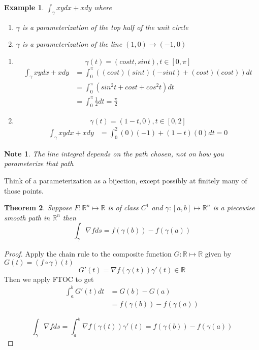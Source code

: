 \documentclass[12pt]{article}
\theoremstyle{plain}
\newtheorem*{note}{Note}
\newtheorem{theorem}{Theorem}[section]
\newtheorem{example}[theorem]{Example}
\theoremstyle{definition}
\begin{document}
\begin{example}
	$\int_\gamma xy dx + xdy$ where
	\begin{enumerate}
		\item{$\gamma$ is a parameterization of the top half of the unit circle}
		\item{$\gamma$ is a parameterization of the line $(1,0) \to (-1,0)$}
	\end{enumerate}

	\begin{enumerate}
	\item{
		$$\gamma (t) = (cost t, sin t), t \in [0,\pi]$$
		\begin{align*}
			\int_\gamma xy dx + xdy &= \int^\pi_0 ((cost)(sint)(-sint) + (cost)(cost))dt\\
			&= \int^\pi_0 (sin^2 t + cost + cos^2 t) dt\\
			&= \int^\pi_0 \frac{1}{2} dt = \frac{\pi}{2}
		\end{align*}

	}
	\item{
	$$\gamma (t) = (1-t,0), t\in [0,2]$$
		\begin{align*}
			\int_\gamma xy dx + xdy &= \int^2_0 (0)(-1) + (1-t)(0)dt = 0
		\end{align*}

	}
	\end{enumerate}
\end{example}

\begin{note}
	The line integral depends on the path chosen, not on how you parameterize that path
\end{note}

Think of a parameterization as a bijection, except possibly at finitely many of those points.

\begin{theorem}
	Suppose $F:\mathbb{R}^n \mapsto \mathbb{R}$ is of class $C^1$ and $\gamma: [a,b] \mapsto \mathbb{R}^n$ is a piecewise smooth path in $\mathbb{R}^n$ then
	$$\int_\gamma \nabla f ds = f(\gamma(b)) - f(\gamma(a))$$
\end{theorem}

\begin{proof}
	Apply the chain rule to the composite function $G:\mathbb{R} \mapsto \mathbb{R}$ given by $G(t) = (f \circ \gamma)(t)$
	$$G'(t) = \nabla f(\gamma(t)) \gamma '(t) \in \mathbb{R}$$
	Then we apply FTOC to get
	\begin{align*}
		\int^b_a G'(t) dt &= G(b) - G(a)\\
		&= f(\gamma(b)) - f(\gamma(a))
	\end{align*}

	$$\int_\gamma \nabla f ds = \int^b_a \nabla f(\gamma(t)) \gamma '(t) = f(\gamma(b)) - f(\gamma(a))$$

\end{proof}
\end{document}
